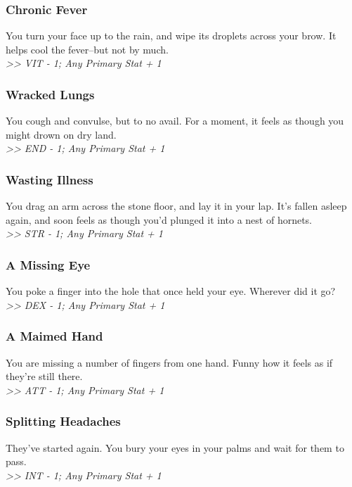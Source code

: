 \begin{multicols}{2}
\subsubsection*{Chronic Fever}
You turn your face up to the rain, and wipe its droplets across your brow. It helps cool the fever--but not by much.\\
\emph{>> VIT - 1; Any Primary Stat + 1}

\subsubsection*{Wracked Lungs}
You cough and convulse, but to no avail. For a moment, it feels as though you might drown on dry land.\\
\emph{>> END - 1; Any Primary Stat + 1}

\subsubsection*{Wasting Illness}
You drag an arm across the stone floor, and lay it in your lap. It’s fallen asleep again, and soon feels as though you’d plunged it into a nest of hornets.\\
\emph{>> STR - 1; Any Primary Stat + 1}

\subsubsection*{A Missing Eye}
You poke a finger into the hole that once held your eye. Wherever did it go?\\
\emph{>> DEX - 1; Any Primary Stat + 1}

\vspace*{\fill}
\columnbreak

\subsubsection*{A Maimed Hand}
You are missing a number of fingers from one hand. Funny how it feels as if they’re still there.\\
\emph{>> ATT - 1; Any Primary Stat + 1}

\subsubsection*{Splitting Headaches}
They’ve started again. You bury your eyes in your palms and wait for them to pass.\\
\emph{>> INT - 1; Any Primary Stat + 1}


\end{multicols}
